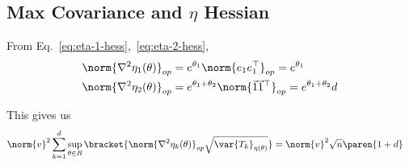 \documentclass[10pt, a4paper]{article}
\begin{document}
\subsection{Max Covariance and $\eta$ Hessian}

From Eq.~\ref{eq:eta-1-hess},~\ref{eq:eta-2-hess},
\begin{align*}
    \norm{\nabla^2 \eta_1(\theta)}_{op}
    &=
    e^{\theta_1} \norm{e_1 e_1^\top}_{op}
    =
    e^{\theta_1}
    \\
    \norm{\nabla^2 \eta_2(\theta)}_{op}
    &=
    e^{\theta_1+\theta_2} \norm{\vec{1}\vec{1}^\top}_{op}
    =
    e^{\theta_1+\theta_2} d
\end{align*}

This gives us
\begin{align*}
    \norm{v}^2
    \sum\limits_{k=1}^d
    \sup\limits_{\theta \in R}
    \bracket{%
        \norm{\nabla^2 \eta_k(\theta)}_{op}
        \sqrt{\var{T_k}_{\eta(\theta)}}
    }
    &=
    \norm{v}^2
    \sqrt{n}
    \paren{%
        1 + d
    }
\end{align*}
     
\end{document}
